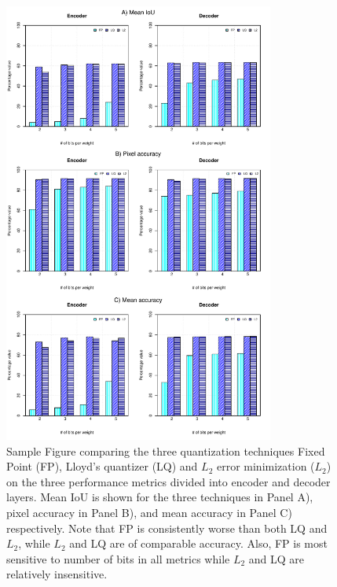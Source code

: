 \documentclass[conference]{IEEEtran}
\begin{document}
\begin{figure}[t!]
\centering
\includegraphics[width=8.9cm,keepaspectratio]{Figure4.pdf}
\caption{Sample Figure comparing the three quantization techniques Fixed Point (FP), Lloyd's quantizer (LQ) and $L_2$ error minimization ($L_2$) on the three performance metrics divided into encoder and decoder layers. Mean IoU is shown for the three techniques in Panel A), pixel accuracy in Panel B), and mean accuracy in Panel C) respectively. Note that FP is consistently worse than both LQ and $L_2$, while $L_2$ and LQ are of comparable accuracy. Also, FP is most sensitive to number of bits in all metrics while $L_2$ and LQ are relatively insensitive.}
\label{Fig:Figure4}
\end{figure}
\end{document}
